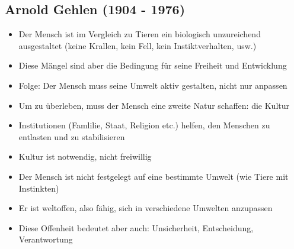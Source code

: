 \subsection{Arnold Gehlen (1904 - 1976)}
\begin{itemize}
    \item Der Mensch ist im Vergleich zu Tieren ein biologisch unzureichend ausgestaltet (keine Krallen, kein Fell, kein Instiktverhalten, usw.)
    \item Diese Mängel sind aber die Bedingung für seine Freiheit und Entwicklung
    \item Folge: Der Mensch muss seine Umwelt aktiv gestalten, nicht nur anpassen
\end{itemize}

\begin{itemize}
    \item Um zu überleben, muss der Mensch eine zweite Natur schaffen: die Kultur
    \item Institutionen (Famlilie, Staat, Religion etc.) helfen, den Menschen zu entlasten und zu stabilisieren
    \item Kultur ist notwendig, nicht freiwillig
\end{itemize}

\begin{itemize}
    \item Der Mensch ist nicht festgelegt auf eine bestimmte Umwelt (wie Tiere mit Instinkten)
    \item Er ist weltoffen, also fähig, sich in verschiedene Umwelten anzupassen
    \item Diese Offenheit bedeutet aber auch: Unsicherheit, Entscheidung, Verantwortung
\end{itemize}
